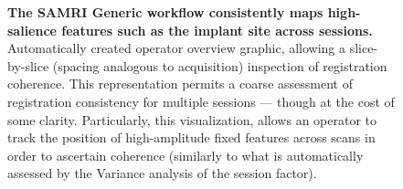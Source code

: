 \begin{figure}[h!]
	\centering
	\setlength{\fboxsep}{0pt}%
	\setlength{\fboxrule}{0.2pt}%
	\caption{
		\textbf{The SAMRI Generic workflow consistently maps high-salience features such as the implant site across sessions.}
		Automatically created operator overview graphic, allowing a slice-by-slice (spacing analogous to acquisition) inspection of registration coherence.
		This representation permits a coarse assessment of registration consistency for multiple sessions --- though at the cost of some clarity.
		Particularly, this visualization, allows an operator to track the position of high-amplitude fixed features across scans in order to ascertain coherence (similarly to what is automatically assessed by the Variance analysis of the session factor).
		}
 	\label{fig:coherence}
\end{figure}

